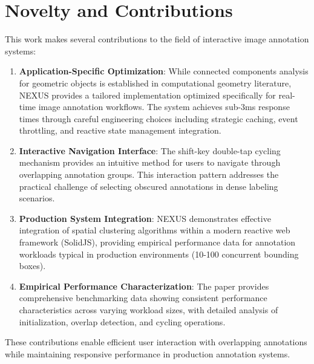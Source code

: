\documentclass[10pt]{article}
\begin{document}
\section{Novelty and Contributions}
This work makes several contributions to the field of interactive image annotation systems:
\begin{enumerate}
    \item \textbf{Application-Specific Optimization}: While connected components analysis for geometric objects is established in computational geometry literature, NEXUS provides a tailored implementation optimized specifically for real-time image annotation workflows. The system achieves sub-3ms response times through careful engineering choices including strategic caching, event throttling, and reactive state management integration.

    \item \textbf{Interactive Navigation Interface}: The shift-key double-tap cycling mechanism provides an intuitive method for users to navigate through overlapping annotation groups. This interaction pattern addresses the practical challenge of selecting obscured annotations in dense labeling scenarios.

    \item \textbf{Production System Integration}: NEXUS demonstrates effective integration of spatial clustering algorithms within a modern reactive web framework (SolidJS), providing empirical performance data for annotation workloads typical in production environments (10-100 concurrent bounding boxes).

    \item \textbf{Empirical Performance Characterization}: The paper provides comprehensive benchmarking data showing consistent performance characteristics across varying workload sizes, with detailed analysis of initialization, overlap detection, and cycling operations.
\end{enumerate}

These contributions enable efficient user interaction with overlapping annotations while maintaining responsive performance in production annotation systems.
\end{document}
